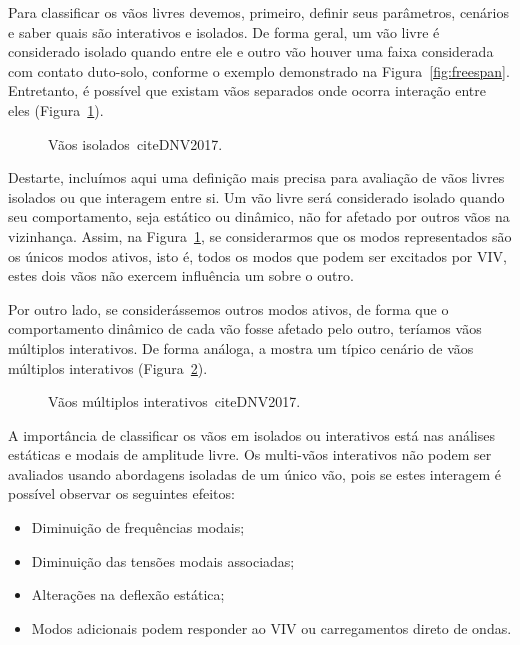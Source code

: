Para classificar os vãos livres devemos, primeiro, definir seus parâmetros, cenários e saber quais são interativos e isolados.
De forma geral, um vão livre é considerado isolado quando entre ele e outro vão houver uma faixa considerada com contato duto-solo, conforme o exemplo demonstrado na Figura~\ref{fig:freespan}.
Entretanto, é possível que existam vãos separados onde ocorra interação entre eles (Figura~\ref{fig:jdsn-vaoisoint}).

\begin{figure}[hbt!]
\begin{center}
\caption{Vãos isolados~cite{DNV2017}.}
\label{fig:jdsn-vaoisoint}
\end{center}
\end{figure}

Destarte, incluímos aqui uma definição mais precisa para avaliação de vãos livres isolados ou que interagem entre si.
Um vão livre será considerado isolado quando seu comportamento, seja estático ou dinâmico, não for afetado por outros vãos na vizinhança.
Assim, na Figura~\ref{fig:jdsn-vaoisoint}, se considerarmos que os modos representados são os únicos modos ativos, isto é, todos os modos que podem ser excitados por VIV, estes dois vãos não exercem influência um sobre o outro.

Por outro lado, se considerássemos outros modos ativos, de forma que o comportamento dinâmico de cada vão fosse afetado pelo outro, teríamos vãos múltiplos interativos.
De forma análoga, a  mostra um típico cenário de vãos múltiplos interativos (Figura~\ref{fig:jdsn-vaomult}).

\begin{figure}[hbt!]
\begin{center}
\caption{Vãos múltiplos interativos~cite{DNV2017}.}
\label{fig:jdsn-vaomult}
\end{center}
\end{figure}

A importância de classificar os vãos em isolados ou interativos está nas análises estáticas e modais de amplitude livre.
Os multi-vãos interativos não podem ser avaliados usando abordagens isoladas de um único vão, pois se estes interagem é possível observar os seguintes efeitos:

	\begin{itemize}
		\item Diminuição de frequências modais;
		\item Diminuição das tensões modais associadas;
		\item Alterações na deflexão estática;
		\item Modos adicionais podem responder ao VIV ou carregamentos direto de ondas.
	\end{itemize}

